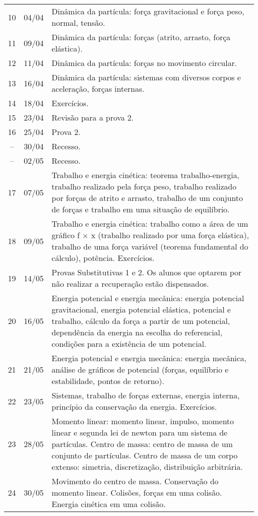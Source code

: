\begin{center}
\begin{longtable}{ccp{70mm}}
10 & 04/04 & Dinâmica da partícula: força gravitacional e força peso, normal, tensão. \\
11 & 09/04 & Dinâmica da partícula: forças (atrito, arrasto, força elástica). \\
12 & 11/04 & Dinâmica da partícula: forças no movimento circular. \\
13 & 16/04 & Dinâmica da partícula: sistemas com diversos corpos e aceleração, forças internas. \\
14 & 18/04 & Exercícios. \\
15 & 23/04 & Revisão para a prova 2. \\
16 & 25/04 & Prova 2. \\
-- & 30/04 & Recesso. \\
-- & 02/05 & Recesso. \\
17 & 07/05 & Trabalho e energia cinética: teorema trabalho-energia, trabalho realizado pela força peso, trabalho realizado por forças de atrito e arrasto, trabalho de um conjunto de forças e trabalho em uma situação de equilíbrio. \\
18 & 09/05 & Trabalho e energia cinética: trabalho como a área de um gráfico f × x (trabalho realizado por uma força elástica), trabalho de uma força variável (teorema fundamental do cálculo), potência. Exercícios. \\
19 & 14/05 & Provas Substitutivas 1 e 2. Os alunos que optarem por não realizar a recuperação estão dispensados. \\
20 & 16/05 & Energia potencial e energia mecânica: energia potencial gravitacional, energia potencial elástica, potencial e trabalho, cálculo da força a partir de um potencial, dependência da energia na escolha do referencial, condições para a existência de um potencial. \\
21 & 21/05 & Energia potencial e energia mecânica: energia mecânica, análise de gráficos de potencial (forças, equilíbrio e estabilidade, pontos de retorno).  \\
22 & 23/05 & Sistemas, trabalho de forças externas, energia interna, princípio da conservação da energia. Exercícios. \\
23 & 28/05 & Momento linear: momento linear, impulso, momento linear e segunda lei de newton para um sistema de partículas. Centro de massa: centro de massa de um conjunto de partículas. Centro de massa de um corpo extenso: simetria, discretização, distribuição arbitrária.  \\
24 & 30/05 & Movimento do centro de massa. Conservação do momento linear. Colisões, forças em uma colisão. Energia cinética em uma colisão.  \\

\end{longtable}
\end{center}
